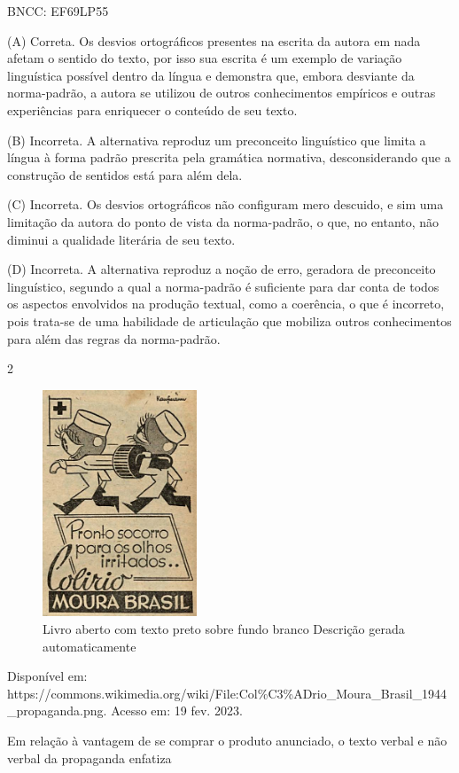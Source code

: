 BNCC: EF69LP55

(A) Correta. Os desvios ortográficos presentes na escrita da autora em
nada afetam o sentido do texto, por isso sua escrita é um exemplo de
variação linguística possível dentro da língua e demonstra que, embora
desviante da norma-padrão, a autora se utilizou de outros conhecimentos
empíricos e outras experiências para enriquecer o conteúdo de seu texto.

(B) Incorreta. A alternativa reproduz um preconceito linguístico que
limita a língua à forma padrão prescrita pela gramática normativa,
desconsiderando que a construção de sentidos está para além dela.

(C) Incorreta. Os desvios ortográficos não configuram mero descuido, e
sim uma limitação da autora do ponto de vista da norma-padrão, o que, no
entanto, não diminui a qualidade literária de seu texto.

(D) Incorreta. A alternativa reproduz a noção de erro, geradora de
preconceito linguístico, segundo a qual a norma-padrão é suficiente para
dar conta de todos os aspectos envolvidos na produção textual, como a
coerência, o que é incorreto, pois trata-se de uma habilidade de
articulação que mobiliza outros conhecimentos para além das regras da
norma-padrão.

\num{2}

\begin{figure}
\centering
\includegraphics[width=1.81474in,height=2.66429in]{./imgSAEB_8_POR/media/image35.png}
\caption{Livro aberto com texto preto sobre fundo branco Descrição
gerada automaticamente}
\end{figure}

Disponível em:
https://commons.wikimedia.org/wiki/File:Col\%C3\%ADrio\_Moura\_Brasil\_1944\_propaganda.png.
Acesso em: 19 fev. 2023.

Em relação à vantagem de se comprar o produto anunciado, o texto verbal
e não verbal da propaganda enfatiza

